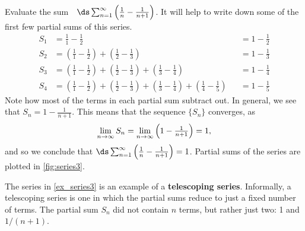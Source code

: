 \begin{example}\label{ex_series3}
Evaluate the sum~~$\ds \sum_{n=1}^\infty \left(\frac1n-\frac1{n+1}\right)$.
\solution
It will help to write down some of the first few partial sums of this series.
\begin{align*}
S_1 &=	\frac11-\frac12 & & = 1-\frac12\\
S_2 &=	\left(\frac11-\frac12\right) + \left(\frac12-\frac13\right) & & = 1-\frac13\\
S_3 &=	\left(\frac11-\frac12\right) + \left(\frac12-\frac13\right)+\left(\frac13-\frac14\right) & &= 1-\frac14\\
S_4 &=	\left(\frac11-\frac12\right) + \left(\frac12-\frac13\right)+\left(\frac13-\frac14\right) +\left(\frac14-\frac15\right)& &= 1-\frac15
\end{align*}
%
%
%
Note how most of the terms in each partial sum subtract out. In general, we see that $S_n = 1-\frac{1}{n+1}$. This means that the sequence $\{S_n\}$ converges,  as
\[\lim_{n\to\infty}S_n=\smallskip\lim_{n\to\infty}\left(1-\tfrac1{n+1}\right)=1,\]
and so we conclude that $\ds\sum_{n=1}^\infty \left(\tfrac1n-\tfrac1{n+1}\right) = 1$. Partial sums of the series are plotted in \autoref{fig:series3}.
\end{example}

The series in \autoref{ex_series3} is an example of a \textbf{telescoping series}. Informally, a telescoping series is one in which the partial sums reduce to just a fixed number of terms. The partial sum $S_n$ did not contain $n$ terms, but rather just two: 1 and $1/(n+1)$.

